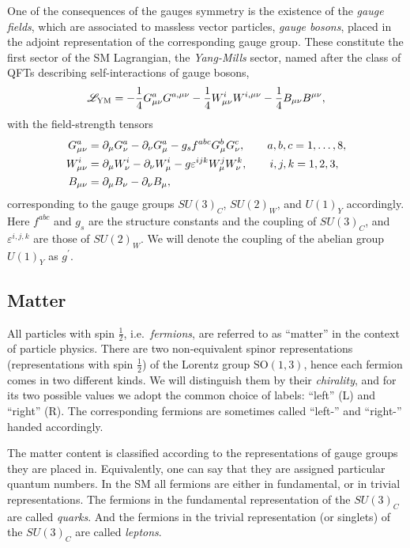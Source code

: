 One of the consequences of the gauges symmetry is the existence of the \emph{gauge fields}, which
are associated to massless vector particles, \emph{gauge bosons}, placed in the adjoint representation of the corresponding gauge group.
These constitute the first sector of the SM Lagrangian, the \emph{Yang-Mills} sector, named after the class of QFTs describing self-interactions
of gauge bosons,
\begin{equation}
  {\mathscr{L}}_{\text{YM}} = 
  -\frac{1}{4}G^a_{\mu\nu}G^{a,\mu\nu}
  -\frac{1}{4}W^i_{\mu\nu}W^{i,\mu\nu} 
  -\frac{1}{4} B_{\mu\nu}B^{\mu\nu},
\end{equation}
with the field-strength tensors
\begin{subequations}
  \begin{align}
    G^a_{\mu\nu} &= \partial_\mu G^a_\nu-\partial_\nu G^a_\mu 
    -g_{s} f^{abc} G^b_\mu G^c_\nu,
    \qquad a,b,c=1,\dots,8, \\
    W^i_{\mu\nu} &= 
    \partial_\mu W^i_\nu-\partial_\nu W^i_\mu -g\varepsilon^{ijk} W^j_\mu W^k_\nu,
    \qquad i,j,k=1,2,3,\\
    B_{\mu\nu} &= \partial_\mu B_\nu-\partial_\nu B_\mu,
  \end{align}
\end{subequations}
corresponding to the gauge groups $SU(3)_C$, $ SU(2)_W$,  and $ U(1)_Y$ accordingly.
Here $f^{abc}$ and $g_s$ are the structure constants and the coupling of $SU(3)_C$,
and $\varepsilon^{i,j,k}$ are those of $ SU(2)_W$. 
We will denote the coupling of the abelian group $U(1)_Y$ as $g^\prime$.

\subsection{Matter}

All particles with spin $\frac{1}{2}$, i.e.\ \emph{fermions}, are referred to as ``matter'' in the context of particle physics.
There are two non-equivalent spinor representations (representations with spin $\frac{1}{2}$) of the Lorentz group $\mathrm{SO}(1,3)$, hence
each fermion comes in two different kinds. 
We will distinguish them by their \emph{chirality}, and for its two possible values we adopt the common choice of labels: ``left'' (L) and ``right'' (R).
The corresponding fermions are sometimes called ``left-'' and ``right-'' handed accordingly.

The matter content is classified according to the representations of gauge groups they are placed in.
Equivalently, one can say that they are assigned particular quantum numbers. 
In the SM all fermions are either in fundamental, or in trivial representations.
The fermions in the fundamental representation of the $SU(3)_C$ are called \emph{quarks}.
And the fermions in the trivial representation (or singlets) of the $SU(3)_C$ are called \emph{leptons}.

